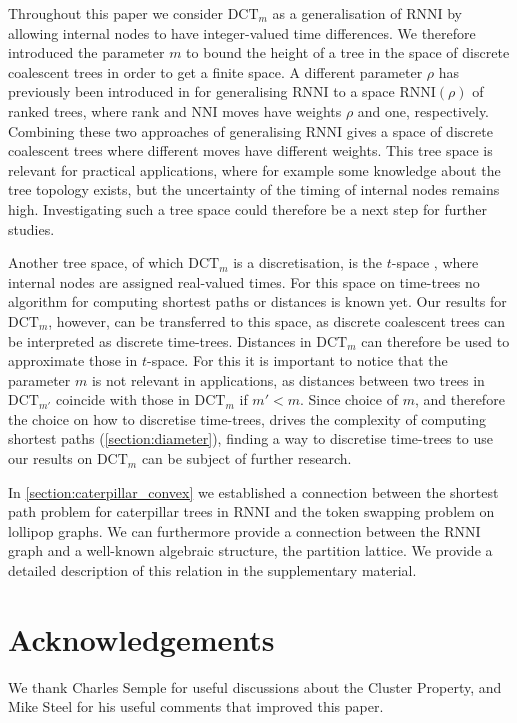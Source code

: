 \documentclass[11pt]{amsart}
\newcommand{\rnni}{\mathrm{RNNI}}
\newcommand{\nni}{\mathrm{NNI}}
\newcommand{\dtt}{\mathrm{DCT}}
\newcommand{\summary}[1]{} %
\begin{document}
\summary{$\rnni(rho)$ and parameter $\rho$ for discrete coalescent trees}
Throughout this paper we consider $\dtt_m$ as a generalisation of $\rnni$ by allowing internal nodes to have integer-valued time differences.
We therefore introduced the parameter $m$ to bound the height of a tree in the space of discrete coalescent trees in order to get a finite space.
A different parameter $\rho$ has previously been introduced in \textcite{Collienne2020-iu} for generalising $\rnni$ to a space $\rnni(\rho)$ of ranked trees, where rank and $\nni$ moves have weights $\rho$ and one, respectively.
Combining these two approaches of generalising $\rnni$ gives a space of discrete coalescent trees where different moves have different weights.
This tree space is relevant for practical applications, where for example some knowledge about the tree topology exists, but the uncertainty of the timing of internal nodes remains high.
Investigating such a tree space could therefore be a next step for further studies.

\summary{t-space}
Another tree space, of which $\dtt_m$ is a discretisation, is the $t$-space \autocite{Gavryushkin2016-uu}, where internal nodes are assigned real-valued times.
For this space on time-trees no algorithm for computing shortest paths or distances is known yet.
Our results for $\dtt_m$, however, can be transferred to this space, as discrete coalescent trees can be interpreted as discrete time-trees.
Distances in $\dtt_m$ can therefore be used to approximate those in $t$-space.
For this it is important to notice that the parameter $m$ is not relevant in applications, as distances between two trees in $\dtt_{m'}$ coincide with those in $\dtt_m$ if $m' < m$.
Since choice of $m$, and therefore the choice on how to discretise time-trees, drives the complexity of computing shortest paths (\autoref{section:diameter}), finding a way to discretise time-trees to use our results on $\dtt_m$ can be subject of further research.

\summary{partition lattice -- can be found in supplement}
In \autoref{section:caterpillar_convex} we established a connection between the shortest path problem for caterpillar trees in $\rnni$ and the token swapping problem on lollipop graphs.
We can furthermore provide a connection between the $\rnni$ graph and a well-known algebraic structure, the partition lattice.
We provide a detailed description of this relation in the supplementary material.


\section*{Acknowledgements}
We thank Charles Semple for useful discussions about the Cluster Property, and Mike Steel for his useful comments that improved this paper.
\end{document}
